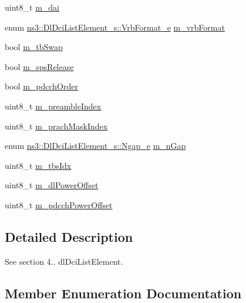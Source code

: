 \begin{DoxyCompactItemize}
\item 
uint8\+\_\+t \hyperlink{structns3_1_1DlDciListElement__s_a15a6e1e2ac18cd6c5d5a2d147da1dbe1}{m\+\_\+dai}
\item 
enum \hyperlink{structns3_1_1DlDciListElement__s_a5386f2af7d6d283f6f885267f4b5a110}{ns3\+::\+Dl\+Dci\+List\+Element\+\_\+s\+::\+Vrb\+Format\+\_\+e} \hyperlink{structns3_1_1DlDciListElement__s_a0a331933f4b624878224b003c786a606}{m\+\_\+vrb\+Format}
\item 
bool \hyperlink{structns3_1_1DlDciListElement__s_a0ca8027c01aa3bb84578e8726a613f43}{m\+\_\+tb\+Swap}
\item 
bool \hyperlink{structns3_1_1DlDciListElement__s_abc2d88f926ab66bd657d2f1d89b7666f}{m\+\_\+sps\+Release}
\item 
bool \hyperlink{structns3_1_1DlDciListElement__s_a34dd35adc3e9998a0f758876ad5fce27}{m\+\_\+pdcch\+Order}
\item 
uint8\+\_\+t \hyperlink{structns3_1_1DlDciListElement__s_a6c4874f91d4289939f92a1a628ba9866}{m\+\_\+preamble\+Index}
\item 
uint8\+\_\+t \hyperlink{structns3_1_1DlDciListElement__s_a01ff38cc0b9822cb4ea74089776f97d4}{m\+\_\+prach\+Mask\+Index}
\item 
enum \hyperlink{structns3_1_1DlDciListElement__s_a39b204f51a179e4de9d1d9883403116c}{ns3\+::\+Dl\+Dci\+List\+Element\+\_\+s\+::\+Ngap\+\_\+e} \hyperlink{structns3_1_1DlDciListElement__s_a7454134e2f76b50d5149999d34238a82}{m\+\_\+n\+Gap}
\item 
uint8\+\_\+t \hyperlink{structns3_1_1DlDciListElement__s_aee5a211453dfb031f5e1a1cbd85bbf0a}{m\+\_\+tbs\+Idx}
\item 
uint8\+\_\+t \hyperlink{structns3_1_1DlDciListElement__s_a7473c94f34c091644a743fd69c68d30d}{m\+\_\+dl\+Power\+Offset}
\item 
uint8\+\_\+t \hyperlink{structns3_1_1DlDciListElement__s_a75c30b799a478401d787014685d369f6}{m\+\_\+pdcch\+Power\+Offset}
\end{DoxyCompactItemize}


\subsection{Detailed Description}
See section 4.. dl\+Dci\+List\+Element. 

\subsection{Member Enumeration Documentation}

